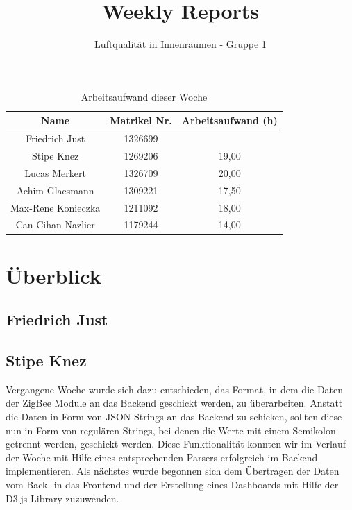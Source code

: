 \documentclass[]{article}
\title{Weekly Reports}
\author{Luftqualität in Innenräumen - Gruppe 1}
\begin{document}
\maketitle

\begin{table}[h!]
	\centering
	\begin{tabular}{|c|c|c|}
		\hline
		{\textbf{Name}}				&		{\textbf{Matrikel Nr.}} & {\textbf{Arbeitsaufwand (h)}} \\
		\hline
		Friedrich Just				&		1326699 				&		\\
		\hline
		Stipe Knez					&		1269206 				&	19,00	\\
		\hline
		Lucas Merkert				&		1326709					&	20,00	\\
		\hline
		Achim Glaesmann				&		1309221					&	17,50	\\
		\hline
		Max-Rene Konieczka			&		1211092					&	18,00	\\
		\hline
		Can Cihan Nazlier			&		1179244					&	14,00	\\
		\hline
	\end{tabular}
	\caption{Arbeitsaufwand dieser Woche}
	\label{tab:worakload}
\end{table}



\section{Überblick}


\subsection{Friedrich Just}



\subsection{Stipe Knez}
Vergangene Woche wurde sich dazu entschieden, das Format, in dem die Daten der ZigBee Module an das Backend geschickt werden, zu überarbeiten. Anstatt die Daten in Form von JSON Strings an das Backend zu schicken, sollten diese nun in Form von regulären Strings, bei denen die Werte mit einem Semikolon getrennt werden, geschickt werden. Diese Funktionalität konnten wir im Verlauf der Woche mit Hilfe eines entsprechenden Parsers erfolgreich im Backend implementieren. Als nächstes wurde begonnen sich dem Übertragen der Daten vom Back- in das Frontend und der Erstellung eines Dashboards mit Hilfe der D3.js Library zuzuwenden.
\end{document}
